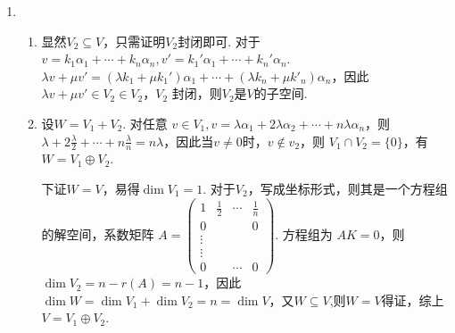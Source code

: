 \begin{enumerate}
    \item \begin{enumerate}
        \item 显然$V_2\subseteq V$，只需证明$V_2$封闭即可. 对于$v=k_1\alpha_1+\cdots+k_n\alpha_n,v'=k_1'\alpha_1+\cdots+k_n'\alpha_n$. $\lambda v+\mu v'=(\lambda k_1+\mu k_1')\alpha_1+\cdots+(\lambda k_n+\mu k'_n)\alpha_n$，因此  $\lambda v+\mu v'\in V_2\in V_2$，$V_2$ 封闭，则$V_2$是$V$的子空间.
        \item 设$W=V_1+V_2$. 对任意 $v\in V_1,v=\lambda \alpha_1+2\lambda\alpha_2+\cdots+n\lambda\alpha_n$，则 $\lambda+2\frac{\lambda}2+\cdots+n\frac{\lambda}n=n\lambda$，因此当$v\ne 0$时，$v\not\in v_2$，则 $V_1\cap V_2=\{0\}$，有$W=V_1\oplus V_2$.

        下证$W=V$，易得$\dim V_1=1$. 对于$V_2$，写成坐标形式，则其是一个方程组的解空间，系数矩阵 $A=\begin{pmatrix}1 &\frac 12&\cdots&\frac 1n\\0&&&0\\ \vdots&&&\\ \vdots\\ 0&&\cdots& 0\end{pmatrix}$. 方程组为 $AK=0$，则 $\dim V_2=n-r(A)=n-1$，因此$\dim W=\dim V_1+\dim V_2=n=\dim V$，又$W\subseteq V$,则$W=V$得证，综上$V=V_1\oplus V_2$.
    \end{enumerate}


\end{enumerate}
